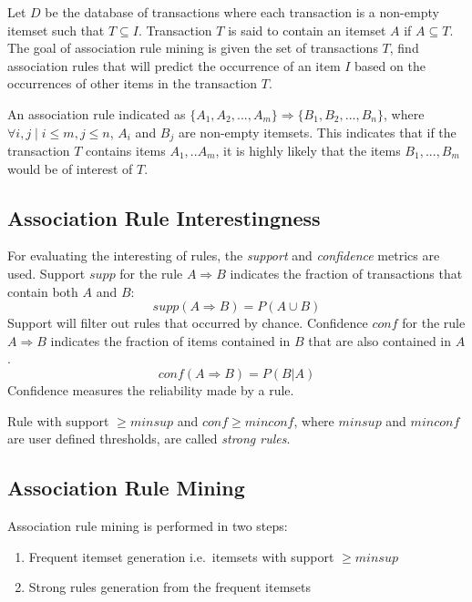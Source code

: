 Let $D$ be the database of transactions where each transaction is a non-empty itemset such that $T \subseteq I$.
Transaction $T$ is said to contain an itemset $A$  if $A\subseteq T$.
The goal of association rule mining is given the set of transactions $T$, 
find association rules that will predict the occurrence of an item $I$ based on the occurrences of other items in the transaction $T$.

An association rule indicated as 
$\{A_{1},A_{2},...,A_{m}\}\Rightarrow \{B_{1},B_{2},...,B_{n}\}$, 
where $\forall i,j \mid i\leq m,j\leq n$, $A_{i}$ and $B_{j}$ are non-empty itemsets. This indicates that if the transaction $T$ contains items $A_{1},..A_{m}$, it is highly likely that the items $B_{1},...,B_{m}$ would be of interest of $T$.
\subsection{Association Rule Interestingness }
For evaluating the interesting of rules, the \emph{support} and \emph{confidence} metrics are used.
Support $supp$ for the rule $A\Rightarrow B$ indicates the fraction of transactions that contain both $A$ and $B$:
\begin{equation}
	supp(A\Rightarrow B) = P(A\cup B)
\end{equation}
Support will filter out rules that occurred by chance.
Confidence $conf$ for the rule $A\Rightarrow B$ indicates the fraction of items contained in $B$ that are also contained in $A$.
\begin{equation}
	conf(A \Rightarrow B) = P(B|A)
\end{equation}
Confidence measures the reliability made by a rule.

Rule with support $\geq minsup$ and $conf\geq minconf$,
where $minsup$ and $minconf$ are user defined thresholds,
are called \emph{strong rules}.
	
\subsection{Association Rule Mining}

Association rule mining is performed in two steps:
\begin{enumerate}
	\item Frequent itemset generation i.e.\ itemsets with support $\geq minsup$
	\item Strong rules generation from the frequent itemsets 
\end{enumerate}

